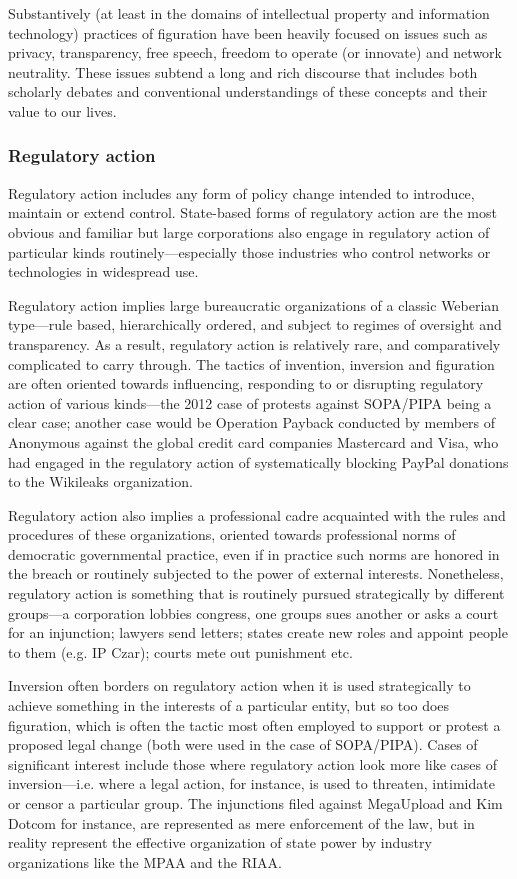 \documentclass[10pt,letter,oneside]{scrartcl}
\begin{document}
Substantively (at least in the domains of intellectual property and information technology) practices of figuration have been heavily focused on issues such as privacy, transparency, free speech, freedom to operate (or innovate) and network neutrality.   These issues subtend a long and rich discourse that includes both scholarly debates and conventional understandings of these concepts and their value to our lives. 

\subsubsection{Regulatory action}

Regulatory action includes any form of policy change intended to introduce, maintain or extend control.   State-based forms of regulatory action are the most obvious and familiar but large corporations also engage in regulatory action of particular kinds routinely---especially those industries who control networks or technologies in widespread use. 

Regulatory action implies large bureaucratic organizations of a classic Weberian type---rule based, hierarchically ordered, and subject to regimes of oversight and transparency.  As a result, regulatory action is relatively rare, and comparatively complicated to carry through.  The tactics of invention, inversion and figuration are often oriented towards influencing, responding to or disrupting regulatory action of various kinds---the 2012 case of protests against SOPA/PIPA being a clear case; another case would be Operation Payback conducted by members of Anonymous against the global credit card companies Mastercard and Visa, who had engaged in the regulatory action of systematically blocking PayPal donations to the Wikileaks organization. 

Regulatory action also implies a professional cadre acquainted with the rules and procedures of these organizations, oriented towards professional norms of democratic governmental practice, even if in practice such norms are honored in the breach or routinely subjected to the power of external interests.  Nonetheless, regulatory action is something that is routinely pursued strategically by different groups---a corporation lobbies congress, one groups sues another or asks a court for an injunction; lawyers send letters; states create new roles and appoint people to them (e.g. IP Czar); courts mete out punishment etc.

Inversion often borders on regulatory action when it is used strategically to achieve something in the interests of a particular entity, but so too does figuration, which is often the tactic most often employed to support or protest a proposed legal change (both were used in the case of SOPA/PIPA).  Cases of significant interest include those where regulatory action look more like cases of inversion---i.e. where a legal action, for instance, is used to threaten, intimidate or censor a particular group. The injunctions filed against MegaUpload and Kim Dotcom for instance, are represented as mere enforcement of the law, but in reality represent the effective organization of state power by industry organizations like the MPAA and the RIAA. 
\end{document}
